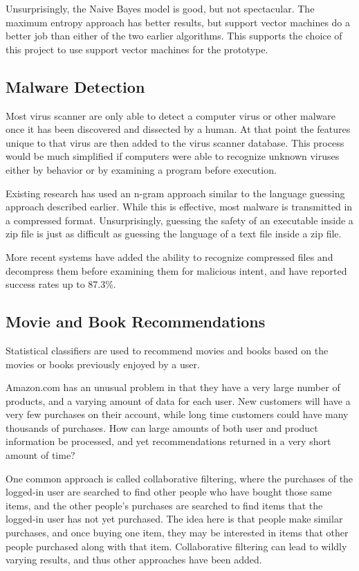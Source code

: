 \documentclass[12pt]{article}
\begin{document}
Unsurprisingly, the Naive Bayes model is good, but not spectacular. The maximum entropy approach has better
results, but support vector machines do a better job than either of the two earlier algorithms. This supports
the choice of this project to use support vector machines for the prototype.
\subsection{Malware Detection}
Most virus scanner are only able to detect a computer virus or other malware once it has been discovered and
dissected by a human. At that point the features unique to that virus are then added to the virus scanner
database.  This process would be much simplified if computers were able to recognize unknown viruses either by
behavior or by examining a program before execution.

Existing research has used an n-gram approach similar to the language guessing approach described
earlier. While this is effective, most malware is transmitted in a compressed format. Unsurprisingly, guessing
the safety of an executable inside a zip file is just as difficult as guessing the language of a text file
inside a zip file.

More recent systems have added the ability to recognize compressed files and decompress them before examining
them for malicious intent, and have reported success rates up to 87.3\%. \citep{perdisci2008mcboost}
\subsection{Movie and Book Recommendations}
Statistical classifiers are used to recommend movies \citep{basu1998recommendation} and books
\citep{linden2003amazon} based on the movies or books previously enjoyed by a user.

Amazon.com has an unusual problem in that they have a very large number of products, and a varying amount of
data for each user. New customers will have a very few purchases on their account, while long time customers
could have many thousands of purchases. How can large amounts of both user and product information be
processed, and yet recommendations returned in a very short amount of time?

One common approach is called collaborative filtering, where the purchases of the logged-in user are searched
to find other people who have bought those same items, and the other people's purchases are searched to find
items that the logged-in user has not yet purchased. The idea here is that people make similar purchases, and
once buying one item, they may be interested in items that other people purchased along with that item.
Collaborative filtering can lead to wildly varying results, and thus other approaches have been added.
\end{document}

